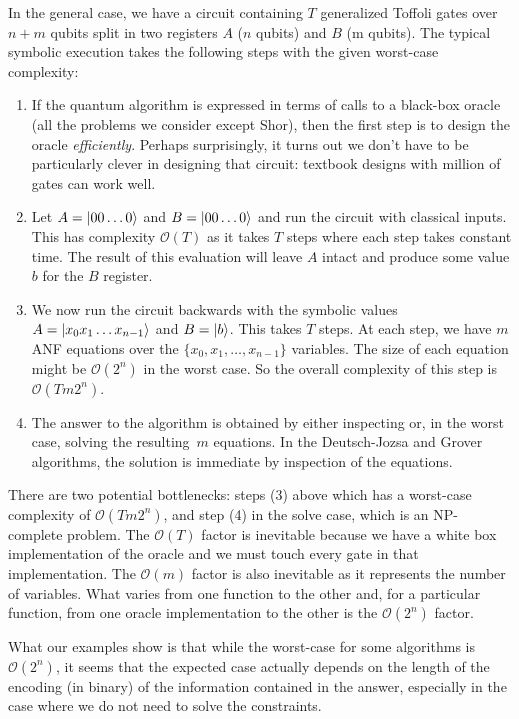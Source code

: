 \documentclass[sigplan,screen]{acmart}
\theoremstyle{definition}
\begin{document}
In the general case, we have a circuit containing $T$ generalized
Toffoli gates over $n+m$ qubits split in two registers $A$ ($n$
qubits) and $B$ (m qubits). The typical symbolic execution takes the
following steps with the given worst-case complexity:

\begin{enumerate}
\item If the quantum algorithm is expressed in terms of calls to a
  black-box oracle (all the problems we consider except Shor), then
  the first step is to design the oracle \emph{efficiently}. Perhaps
  surprisingly, it turns out we don’t have to be particularly clever
  in designing that circuit: textbook designs with million of gates
  can work well.
  \item Let $A = \ket{00\ldots 0}$ and $B = \ket{00\ldots 0}$ and run the
circuit with classical inputs. This has complexity $\mathcal{O}(T)$ as
it takes $T$ steps where each step takes constant time. The result of
this evaluation will leave $A$ intact and produce some value $b$ for
the $B$ register.
\item We now run the circuit backwards with the symbolic
values $A = \ket{x_0 x_1 \ldots x_{n-1}}$ and $B = \ket{b}$. This
takes $T$ steps. At each step, we have $m$ ANF equations over the
$\{x_0,x_1,\ldots,x_{n-1}\}$ variables. The size of each equation
  might be $\mathcal{O}(2^n)$ in the worst case. So the overall
  complexity of this step is $\mathcal{O}(Tm 2^n)$.
\item The answer to the algorithm is obtained by
  either inspecting or, in the worst case, solving
  the resulting~$m$ equations. In the Deutsch-Jozsa and Grover
  algorithms, the solution is immediate by inspection of the
  equations.
\end{enumerate}
There are two potential bottlenecks: steps (3) above which has a
worst-case complexity of $\mathcal{O}(Tm 2^n)$, and step (4)
in the solve case, which is an NP-complete problem. The $\mathcal{O}(T)$
factor is inevitable because we have a white box implementation of the
oracle and we must touch every gate in that implementation. The
$\mathcal{O}(m)$ factor is also inevitable as it represents the number
of variables. What varies from one function to the other and, for a
particular function, from one oracle implementation to the other is
the $\mathcal{O}(2^n)$ factor.

What our examples show is that while the worst-case for some
algorithms is $\mathcal{O}(2^n)$,
it seems that the expected case actually depends on the length of the
encoding (in binary) of the information contained in the answer, especially
in the case where we do not need to solve the constraints.
\end{document}
